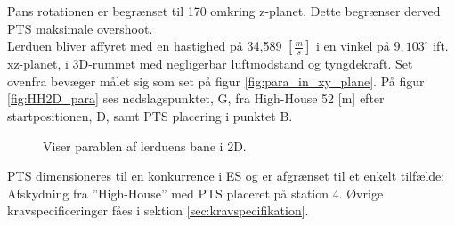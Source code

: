 Pans rotationen er begrænset til 170\degree{} omkring z-planet.
Dette begrænser derved PTS maksimale overshoot.\\

Lerduen bliver affyret med en hastighed på 34,589 \([\frac{m}{s}]\) i en vinkel på \(9,103^{\circ}\) ift. xz-planet,
i 3D-rummet med negligerbar luftmodstand og tyngdekraft. Set ovenfra bevæger målet sig som set på figur \ref{fig:para_in_xy_plane}. 
På figur \ref{fig:HH2D_para} ses nedslagspunktet, G, fra High-House 52 [m] efter startpositionen, D, samt  
PTS placering i punktet B.\\
\begin{figure}[h!]
\centering
{}
\caption[Lerduens parabel i 2D]{Viser parablen af lerduens bane i 2D.}
\end{figure}

PTS dimensioneres til en konkurrence i ES og er afgrænset til et enkelt tilfælde:
Afskydning fra ”High-House” med PTS placeret på station 4.
Øvrige kravspecificeringer fåes i sektion \ref{sec:kravspecifikation}.
